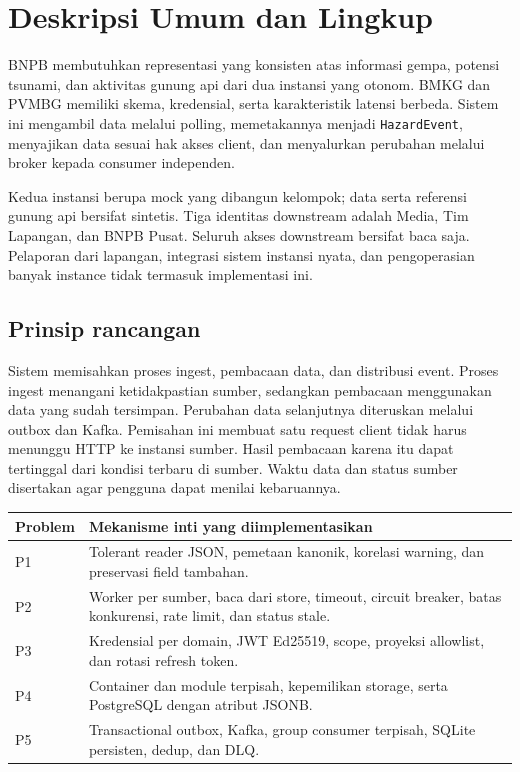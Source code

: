 \section{Deskripsi Umum dan Lingkup}
BNPB membutuhkan representasi yang konsisten atas informasi gempa, potensi tsunami, dan aktivitas gunung api dari dua instansi yang otonom. BMKG dan PVMBG memiliki skema, kredensial, serta karakteristik latensi berbeda. Sistem ini mengambil data melalui polling, memetakannya menjadi \texttt{HazardEvent}, menyajikan data sesuai hak akses client, dan menyalurkan perubahan melalui broker kepada consumer independen.

Kedua instansi berupa mock yang dibangun kelompok; data serta referensi gunung api bersifat sintetis. Tiga identitas downstream adalah Media, Tim Lapangan, dan BNPB Pusat. Seluruh akses downstream bersifat baca saja. Pelaporan dari lapangan, integrasi sistem instansi nyata, dan pengoperasian banyak instance tidak termasuk implementasi ini.

\subsection{Prinsip rancangan}
Sistem memisahkan proses ingest, pembacaan data, dan distribusi event. Proses ingest menangani ketidakpastian sumber, sedangkan pembacaan menggunakan data yang sudah tersimpan. Perubahan data selanjutnya diteruskan melalui outbox dan Kafka. Pemisahan ini membuat satu request client tidak harus menunggu HTTP ke instansi sumber. Hasil pembacaan karena itu dapat tertinggal dari kondisi terbaru di sumber. Waktu data dan status sumber disertakan agar pengguna dapat menilai kebaruannya.

\begin{tabularx}{\linewidth}{lY}
\toprule Problem & Mekanisme inti yang diimplementasikan\\\midrule
P1 & Tolerant reader JSON, pemetaan kanonik, korelasi warning, dan preservasi field tambahan.\\
P2 & Worker per sumber, baca dari store, timeout, circuit breaker, batas konkurensi, rate limit, dan status stale.\\
P3 & Kredensial per domain, JWT Ed25519, scope, proyeksi allowlist, dan rotasi refresh token.\\
P4 & Container dan module terpisah, kepemilikan storage, serta PostgreSQL dengan atribut JSONB.\\
P5 & Transactional outbox, Kafka, group consumer terpisah, SQLite persisten, dedup, dan DLQ.\\
\bottomrule
\end{tabularx}
\par
